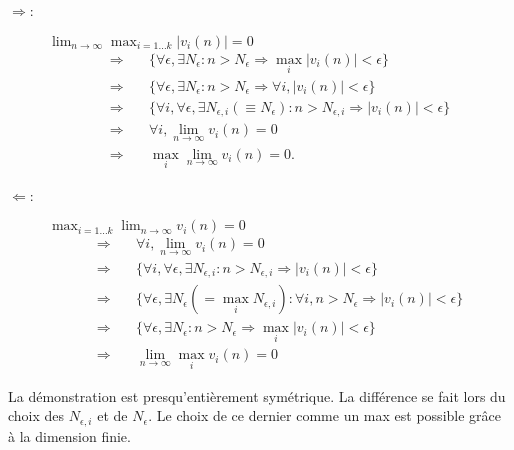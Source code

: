 \begin{description}
  \item[$\Rightarrow$:] $\lim_{n \to \infty} \max_{i=1 \dots k} |v_i(n)| = 0$
  \begin{align*}
    \Rightarrow \quad & \{\forall \epsilon, \exists N_\epsilon: n > N_\epsilon \Rightarrow \max_i |v_i(n)| < \epsilon\} \\
    \Rightarrow \quad & \{\forall \epsilon, \exists N_\epsilon: n > N_\epsilon \Rightarrow \forall i, |v_i(n)| < \epsilon\} \\
    \Rightarrow \quad & \{\forall i, \forall \epsilon, \exists N_{\epsilon, i}(\equiv N_\epsilon): n > N_{\epsilon, i} \Rightarrow |v_i(n)| < \epsilon\} \\
    \Rightarrow \quad & \forall i, \lim_{n \to \infty} v_i(n) = 0 \\
    \Rightarrow \quad & \max_i \lim_{n \to \infty} v_i(n) = 0.
  \end{align*}
  \item[$\Leftarrow$:] $\max_{i=1 \dots k} \lim_{n \to \infty} v_i(n) = 0$
  \begin{align*}
    \Rightarrow \quad & \forall i, \lim_{n \to \infty} v_i(n) = 0 \\
    \Rightarrow \quad & \{\forall i, \forall \epsilon, \exists N_{\epsilon, i}: n > N_{\epsilon, i} \Rightarrow |v_i(n)| < \epsilon\}\\
    \Rightarrow \quad & \{\forall \epsilon, \exists N_\epsilon (= \max_i N_{\epsilon, i}): \forall i, n > N_\epsilon \Rightarrow |v_i(n)| < \epsilon\}\\
    \Rightarrow \quad & \{\forall \epsilon, \exists N_\epsilon: n > N_\epsilon \Rightarrow \max_i |v_i(n)| < \epsilon\}\\
    \Rightarrow \quad & \lim_{n \to \infty} \max_i v_i(n) = 0
  \end{align*}
\end{description}
\eproof

\remark
La démonstration est presqu'entièrement symétrique. La différence se fait lors du choix des $N_{\epsilon, i}$ et de $N_\epsilon$. Le choix de ce dernier comme un max est possible grâce à la dimension finie.


